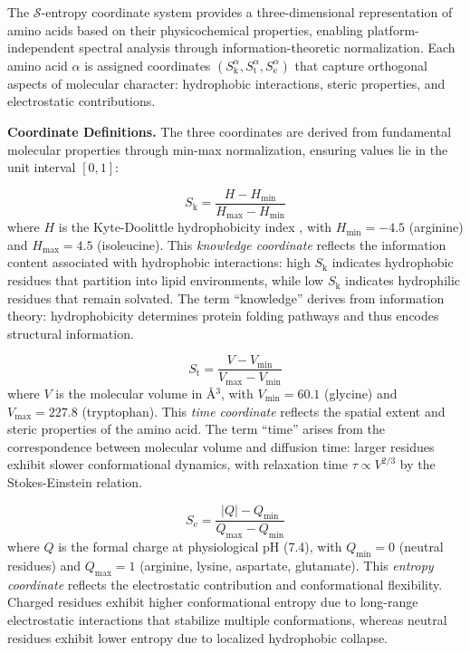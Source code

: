 \documentclass[11pt,twocolumn]{article}
\newcommand{\sentropy}{$\mathcal{S}$-entropy}
\newcommand{\Sk}{S_{\text{k}}}
\newcommand{\St}{S_{\text{t}}}
\newcommand{\Se}{S_{\text{e}}}
\begin{document}
The \sentropy{} coordinate system provides a three-dimensional representation of amino acids based on their physicochemical properties, enabling platform-independent spectral analysis through information-theoretic normalization. Each amino acid $\alpha$ is assigned coordinates $(\Sk^\alpha, \St^\alpha, \Se^\alpha)$ that capture orthogonal aspects of molecular character: hydrophobic interactions, steric properties, and electrostatic contributions.

\textbf{Coordinate Definitions.} The three coordinates are derived from fundamental molecular properties through min-max normalization, ensuring values lie in the unit interval $[0, 1]$:

\begin{equation}
    \Sk = \frac{H - H_{\min}}{H_{\max} - H_{\min}}
    \label{eq:sk}
\end{equation}
where $H$ is the Kyte-Doolittle hydrophobicity index \cite{kyte1982simple}, with $H_{\min} = -4.5$ (arginine) and $H_{\max} = 4.5$ (isoleucine). This \textit{knowledge coordinate} reflects the information content associated with hydrophobic interactions: high $\Sk$ indicates hydrophobic residues that partition into lipid environments, while low $\Sk$ indicates hydrophilic residues that remain solvated. The term ``knowledge'' derives from information theory: hydrophobicity determines protein folding pathways and thus encodes structural information.

\begin{equation}
    \St = \frac{V - V_{\min}}{V_{\max} - V_{\min}}
    \label{eq:st}
\end{equation}
where $V$ is the molecular volume in \AA$^3$, with $V_{\min} = 60.1$ (glycine) and $V_{\max} = 227.8$ (tryptophan). This \textit{time coordinate} reflects the spatial extent and steric properties of the amino acid. The term ``time'' arises from the correspondence between molecular volume and diffusion time: larger residues exhibit slower conformational dynamics, with relaxation time $\tau \propto V^{2/3}$ by the Stokes-Einstein relation.

\begin{equation}
    \Se = \frac{|Q| - Q_{\min}}{Q_{\max} - Q_{\min}}
    \label{eq:se}
\end{equation}
where $Q$ is the formal charge at physiological pH (7.4), with $Q_{\min} = 0$ (neutral residues) and $Q_{\max} = 1$ (arginine, lysine, aspartate, glutamate). This \textit{entropy coordinate} reflects the electrostatic contribution and conformational flexibility. Charged residues exhibit higher conformational entropy due to long-range electrostatic interactions that stabilize multiple conformations, whereas neutral residues exhibit lower entropy due to localized hydrophobic collapse.
\end{document}
